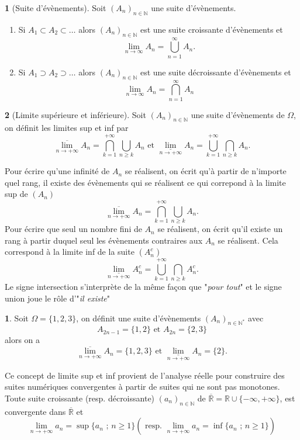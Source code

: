 \documentclass[8pt,notheorems]{beamer}
\def \N{\mathbb N}
\newcommand{\RL}{\mathbb{R}}
\def \limsup{\underset{n\rightarrow+\infty}{\overline{\lim}}}
\def \liminf{\underset{n\rightarrow+\infty}{\underline{\lim}}}
\theoremstyle{definition}
\newtheorem{definition}{\translate{Definition}}
\theoremstyle{example}
\newtheorem{example}{\translate{Exemple}}
\theoremstyle{mystyle}
\theoremstyle{plain}
\begin{document}
\begin{frame}[allowframebreaks]
\begin{definition}[Suite d'évènements]
Soit $(A_n)_{n\in\N}$ une suite d'évènements. 
\begin{enumerate}
    \item Si $A_1\subset A_2\subset \ldots$ alors $(A_n)_{n\in\N}$ est une suite croissante d'évènements et 
    $$
    \underset{n\rightarrow\infty}{\lim} A_n = \bigcup_{n=1}^{\infty}A_n.
    $$
    \item Si $A_1\supset A_2\supset \ldots$ alors $(A_n)_{n\in\N}$ est une suite décroissante d'évènements et 
    $$
    \underset{n\rightarrow\infty}{\lim} A_n = \bigcap_{n=1}^{\infty}A_n
    $$
\end{enumerate}
\end{definition}
\begin{definition}[Limite supérieure et inférieure]
Soit $(A_n)_{n\in\N}$ une suite d'évènements de $\Omega$, on définit les limites sup et inf par 
$$
\limsup A_n = \bigcap_{k = 1}^{+\infty}\bigcup_{n\geq k}A_n
\text{ et }\liminf A_n = \bigcup_{k = 1}^{+\infty}\bigcap_{n\geq k}A_n.$$
\end{definition}
Pour écrire qu'une infinité de $A_n$ se réalisent, on écrit qu'à partir de n'importe quel rang, il existe des évènements qui se réalisent ce qui correpond à la limite sup de $(A_n)$
$$
\limsup A_n = \bigcap_{k = 1}^{+\infty}\bigcup_{n\geq k}A_n.
$$
Pour écrire que seul un nombre fini de $A_n$ se réalisent, on écrit qu'il existe un rang à partir duquel seul les évènements contraires aux $A_n$ se réalisent. Cela correspond à la limite inf de la suite $(A_n^c)$
$$
\liminf A_n^c = \bigcup_{k = 1}^{+\infty}\bigcap_{n\geq k}A_n^c.
$$
Le signe intersection s'interprète de la même façon que "\textit{pour tout}" et le signe union joue le rôle d'"\textit{il existe}"
\begin{example}
Soit $\Omega = \{1,2,3\}$, on définit une suite d'évènements $(A_n)_{n\in\N^{\ast}}$ avec 
$$
A_{2n-1} = \{1, 2\}\text{ et }A_{2n} = \{2,3\}
$$
alors on a 
$$
\limsup A_n = \{1,2,3\}\text{ et }\liminf A_n = \{2\}.
$$
\end{example}
Ce concept de limite sup et inf provient de l'analyse réelle pour construire des suites numériques convergentes à partir de suites qui ne sont pas monotones. Toute suite croissante (resp. décroissante) $(a_n)_{n\in\N}$ de $\overline{\RL} = \RL\cup\{-\infty, +\infty\}$, est convergente dans $\overline{\RL}$ et
$$
\underset{n\rightarrow+\infty}{\lim} a_n=\sup\{a_n\text{ ; }n\geq1\}\left(\text{ resp. }\underset{n\rightarrow+\infty}{\lim} a_n=\inf\{a_n\text{ ; }n\geq1\}\right)
$$
\end{frame}
\end{document}
